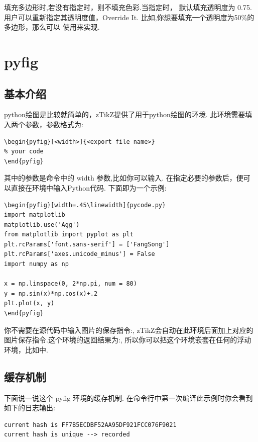 \begin{remark}
填充多边形时,若没有指定时，则不填充色彩.当指定时，
默认填充透明度为 0.75. 用户可以重新指定其透明度值，Override It. 比如,你想要填充一个透明度为50\%的多边形，那么可以
使用来实现.
\end{remark}

\section{pyfig}
\subsection{基本介绍}
python绘图是比较就简单的，zTikZ提供了用于python绘图的环境.
此环境需要填入两个参数，参数格式为:

\begin{verbatim}
\begin{pyfig}[<width>]{<export file name>}
% your code
\end{pyfig}
\end{verbatim}

其中的参数是命令\cmd[F]{\texttt{[image: ]}}中的 width 参数,比如你可以输入. 
在指定必要的参数后，便可以直接在环境中输入Python代码. 下面即为一个示例:

\begin{verbatim}
\begin{pyfig}[width=.45\linewidth]{pycode.py}
import matplotlib 
matplotlib.use('Agg')
from matplotlib import pyplot as plt
plt.rcParams['font.sans-serif'] = ['FangSong']  
plt.rcParams['axes.unicode_minus'] = False
import numpy as np

x = np.linspace(0, 2*np.pi, num = 80)
y = np.sin(x)*np.cos(x)+.2
plt.plot(x, y)
\end{pyfig}
\end{verbatim}

你不需要在源代码中输入图片的保存指令:, zTikZ会自动在此环境后面加上对应的
图片保存指令.这个环境的返回结果为:,
所以你可以把这个环境嵌套在任何的浮动环境，比如中. 

\subsection{缓存机制}
下面说一说这个 pyfig 环境的缓存机制. 在命令行中第一次编译此示例时你会看到如下的日志输出:
\begin{verbatim}
current hash is FF7B5ECDBF52AA95DF921FCC076F9021
current hash is unique --> recorded
\end{verbatim}

